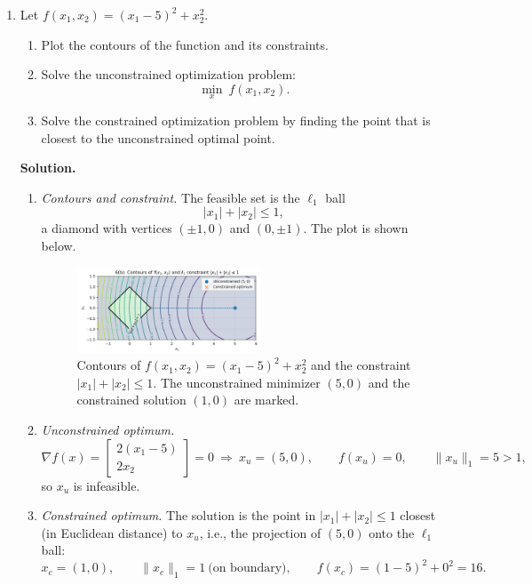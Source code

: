 \documentclass[11pt]{article}
\begin{document}
\begin{enumerate}[label=6(\alph*)]
	\item Let $f(x_1,x_2)=(x_1-5)^2+x_2^2$.
	\begin{enumerate}[label=\arabic*)]
		\item Plot the contours of the function and its constraints.
		\item Solve the unconstrained optimization problem:
		\[
		\min_{x}\ f(x_1,x_2). \tag{21}
		\]
		\item Solve the constrained optimization problem by finding the point that is
		closest to the unconstrained optimal point.
	\end{enumerate}
	
	\textbf{Solution.}
	
	\begin{enumerate}[label=\arabic*)]
		\item \emph{Contours and constraint.} The feasible set is the $\ell_1$ ball
		\[
		|x_1|+|x_2|\le 1,
		\]
		a diamond with vertices $(\pm 1,0)$ and $(0,\pm 1)$. The plot is shown below.
		
		\begin{figure}[H]
			\centering
			\includegraphics[width=0.55\textwidth]{6b.png}
			\caption{Contours of $f(x_1,x_2)=(x_1-5)^2+x_2^2$ and the constraint $|x_1|+|x_2|\le 1$. The unconstrained minimizer $(5,0)$ and the constrained solution $(1,0)$ are marked.}
		\end{figure}
		
		\item \emph{Unconstrained optimum.}
		\[
		\nabla f(x)=\begin{bmatrix}2(x_1-5)\\ 2x_2\end{bmatrix}=0
		\ \Rightarrow\ x_u=(5,0),\qquad f(x_u)=0,\qquad \|x_u\|_1=5>1,
		\]
		so $x_u$ is infeasible.
		
		\item \emph{Constrained optimum.} The solution is the point in $|x_1|+|x_2|\le 1$ closest (in Euclidean distance) to $x_u$, i.e., the projection of $(5,0)$ onto the $\ell_1$ ball:
		\[
		x_c=(1,0),\qquad \|x_c\|_1=1\ \text{(on boundary)},\qquad f(x_c)=(1-5)^2+0^2=16.
		\]
	\end{enumerate}
	

\end{enumerate}
\end{document}
